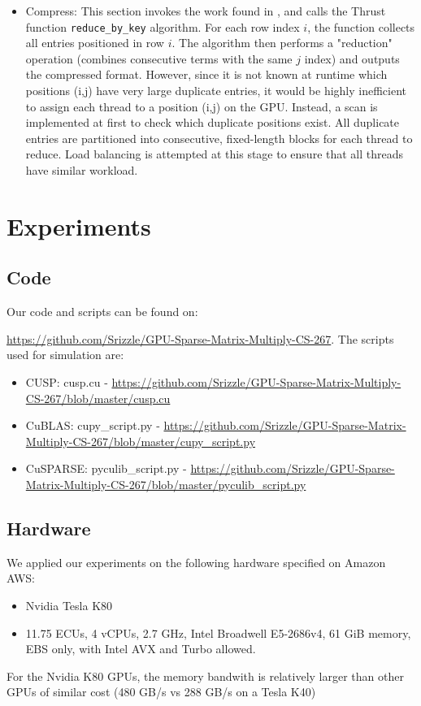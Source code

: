 \documentclass[12pt]{article}
\def\code#1{\texttt{#1}}
\begin{document}
\begin{itemize}
\item Compress: This section invokes the work found in \cite{multigrid}, and calls the Thrust function \code{reduce\_by\_key} algorithm. For each row index $i$, the function collects all entries positioned in row $i$. The algorithm then performs a "reduction" operation (combines consecutive terms with the same $j$ index) and outputs the compressed format. However, since it is not known at runtime which positions (i,j) have very large duplicate entries, it would be highly inefficient to assign each thread to a position (i,j) on the GPU. Instead, a scan is implemented at first to check which duplicate positions exist. All duplicate entries are partitioned into consecutive, fixed-length blocks for each thread to reduce. Load balancing is attempted at this stage to ensure that all threads have similar workload. 
\end{itemize}



\section{Experiments}

\subsection{Code}
\hspace{0.5cm}Our code and scripts can be found on:

\url{https://github.com/Srizzle/GPU-Sparse-Matrix-Multiply-CS-267}. The scripts used for simulation are: 
\begin{itemize}
\item CUSP: cusp.cu - \url{https://github.com/Srizzle/GPU-Sparse-Matrix-Multiply-CS-267/blob/master/cusp.cu}
\item CuBLAS: cupy\_script.py - \url{https://github.com/Srizzle/GPU-Sparse-Matrix-Multiply-CS-267/blob/master/cupy_script.py}
\item CuSPARSE: pyculib\_script.py - \url{https://github.com/Srizzle/GPU-Sparse-Matrix-Multiply-CS-267/blob/master/pyculib_script.py}
\end{itemize}


\subsection{Hardware}
\hspace{0.5cm}We applied our experiments on the following hardware specified on Amazon AWS:
\begin{itemize}
\item Nvidia Tesla K80 
\item 11.75 ECUs, 4 vCPUs, 2.7 GHz, Intel Broadwell E5-2686v4, 61 GiB memory, EBS only, with Intel AVX and Turbo allowed. 
\end{itemize}
\hspace{0.5cm}For the Nvidia K80 GPUs, the memory bandwith is relatively larger than other GPUs of similar cost (480 GB/s vs 288 GB/s on a Tesla K40) 
\end{document}
